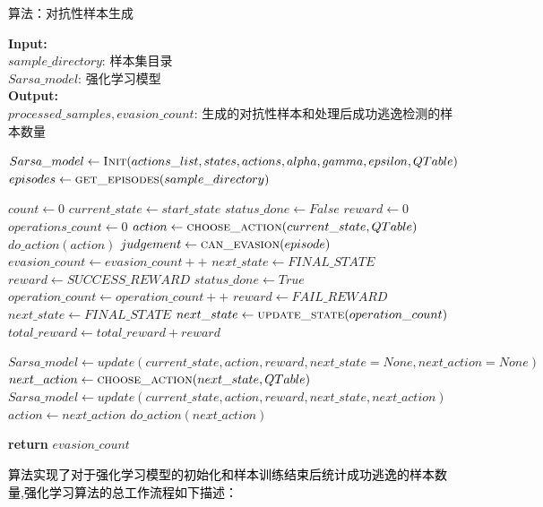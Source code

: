 \begin{algorithm}
	\caption{算法：对抗性样本生成}
	\label{alg1}
	\textbf{Input:} \\
	\hspace*{1cm} $sample\_directory$: 样本集目录 \\
	\hspace*{1cm} $Sarsa\_model$: 强化学习模型 \\
	\textbf{Output:} \\
	\hspace*{1cm} $processed\_samples,evasion\_count$: 生成的对抗性样本和处理后成功逃逸检测的样本数量
	\begin{algorithmic}[1]
            \State $Sarsa\_model \gets \Call{Init}{actions\_list,states,actions, alpha,gamma,epsilon,QTable}$
            \State $episodes \gets \Call{get\_episodes}{sample\_directory}$

      	\State $count \gets 0$
            \State $current\_state \gets start\_state$
            \State $status\_done \gets False$
            \State $reward \gets 0$
            \State $operations\_count \gets 0$
            \State $action \gets \Call{choose\_action}{current\_state,QTable}$
            \State $do\_action(action)$
            \State $judgement \gets \Call{can\_evasion}{episode}$
            \State $evasion\_count \gets evasion\_count++$
            \State $next\_state \gets FINAL\_STATE$
            \State $reward \gets SUCCESS\_REWARD$
            \State $status\_done \gets True$
            \Else
            \State $operation\_count \gets operation\_count++$
            \State $reward \gets FAIL\_REWARD$
            \State $next\_state \gets FINAL\_STATE$
            \Else
            \State $next\_state \gets \Call{update\_state}{operation\_count}$
            \EndIf
            \EndIf
            \State $total\_reward \gets total\_reward+reward$

            \State $Sarsa\_model \gets update(current\_state,action,reward,next\_state=None,next\_action=None)$
            \Else
            \State $next\_action \gets \Call{choose\_action}{next\_state,QTable}$
            \State $Sarsa\_model \gets update(current\_state,action,reward,next\_state,next\_action)$
            \State $action \gets next\_action$
            \State $do\_action(next\_action)$
            \EndIf
            
            \EndWhile
     	\EndFor       
            \State \textbf{return} $evasion\_count$
		\EndFunction
	\end{algorithmic}
\end{algorithm}
\textcolor{black}{算法实现了对于强化学习模型的初始化和样本训练结束后统计成功逃逸的样本数量,强化学习算法的总工作流程如下描述：}

